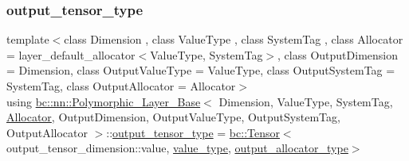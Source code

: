 \subsubsection{\texorpdfstring{output\+\_\+tensor\+\_\+type}{output\_tensor\_type}\hspace{0.1cm}{\footnotesize\ttfamily [1/2]}}
{\footnotesize\ttfamily template$<$class Dimension , class Value\+Type , class System\+Tag , class Allocator  = layer\+\_\+default\+\_\+allocator$<$\+Value\+Type, System\+Tag$>$, class Output\+Dimension  = Dimension, class Output\+Value\+Type  = Value\+Type, class Output\+System\+Tag  = System\+Tag, class Output\+Allocator  = Allocator$>$ \\
using \hyperlink{structbc_1_1nn_1_1Polymorphic__Layer__Base}{bc\+::nn\+::\+Polymorphic\+\_\+\+Layer\+\_\+\+Base}$<$ Dimension, Value\+Type, System\+Tag, \hyperlink{classbc_1_1allocators_1_1Allocator}{Allocator}, Output\+Dimension, Output\+Value\+Type, Output\+System\+Tag, Output\+Allocator $>$\+::\hyperlink{structbc_1_1nn_1_1Polymorphic__Layer__Base_aaa3bdb6355a104df7c68d46fd4ffa15a}{output\+\_\+tensor\+\_\+type} =  \hyperlink{namespacebc_a659391e47ab612be3ba6c18cf9c89159}{bc\+::\+Tensor}$<$output\+\_\+tensor\+\_\+dimension\+::value, \hyperlink{structbc_1_1nn_1_1Polymorphic__Layer__Base_aa7d46845ee0a4544003a6f8fe3b7f52a}{value\+\_\+type}, \hyperlink{structbc_1_1nn_1_1Polymorphic__Layer__Base_a4bc904c1787b9da18e35d0c6b60ac59f}{output\+\_\+allocator\+\_\+type}$>$}

\mbox{\label{structbc_1_1nn_1_1Polymorphic__Layer__Base_aaa3bdb6355a104df7c68d46fd4ffa15a}} 
